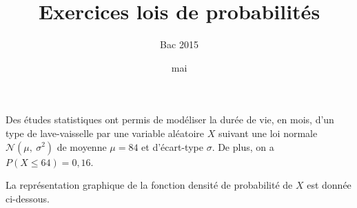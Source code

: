 \documentclass[12pt,french]{article}
\title{Exercices lois de probabilités}
\date{mai \the\year}
\author{Bac 2015}
\begin{document}
	
\maketitle

\begin{question}[subtitle={Pondichery 2015}]
Des études statistiques ont permis de modéliser la durée de vie, en mois, d'un type de lave-vaisselle par une variable aléatoire $X$ suivant une loi normale $\mathcal{N}\left(\mu,~ \sigma^2\right)$ de moyenne $\mu = 84$ et d'écart-type $\sigma$. De plus, on a $P(X \leqslant 64) = 0,16$. 

La représentation graphique de la fonction densité de probabilité de $X$ est donnée ci-dessous.

%

\end{question}
\end{document}
